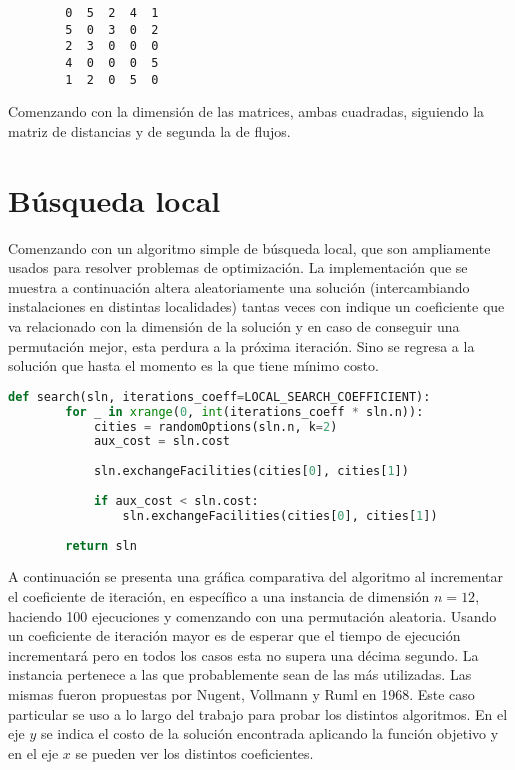 \newpage

\begin{lstlisting}
        0  5  2  4  1
        5  0  3  0  2
        2  3  0  0  0
        4  0  0  0  5
        1  2  0  5  0
\end{lstlisting}

Comenzando con la dimensión de las matrices, ambas cuadradas, siguiendo la matriz de distancias y de segunda la de flujos.

\section*{Búsqueda local}

Comenzando con un algoritmo simple de búsqueda local, que son ampliamente usados para resolver problemas de optimización. La implementación que se muestra a continuación altera aleatoriamente una solución (intercambiando instalaciones en distintas localidades) tantas veces con indique un coeficiente que va relacionado con la dimensión de la solución y en caso de conseguir una permutación mejor, esta perdura a la próxima iteración. Sino se regresa a la solución que hasta el momento es la que tiene mínimo costo.

\begin{lstlisting}[language=Python]
    def search(sln, iterations_coeff=LOCAL_SEARCH_COEFFICIENT):
        for _ in xrange(0, int(iterations_coeff * sln.n)):
            cities = randomOptions(sln.n, k=2)
            aux_cost = sln.cost
    
            sln.exchangeFacilities(cities[0], cities[1])
    
            if aux_cost < sln.cost:
                sln.exchangeFacilities(cities[0], cities[1])
    
        return sln
\end{lstlisting}

A continuación se presenta una gráfica comparativa del algoritmo al incrementar el coeficiente de iteración, en específico a una instancia de dimensión $n=12$, haciendo 100 ejecuciones y comenzando con una permutación aleatoria. Usando un coeficiente de iteración mayor es de esperar que el tiempo de ejecución incrementará pero en todos los casos esta no supera una décima segundo. La instancia pertenece a las que probablemente sean de las más utilizadas. Las mismas fueron propuestas por Nugent, Vollmann y Ruml en 1968\cite{nug12}. Este caso particular se uso a lo largo del trabajo para probar los distintos algoritmos. En el eje $y$ se indica el costo de la solución encontrada aplicando la función objetivo y en el eje $x$ se pueden ver los distintos coeficientes.  

